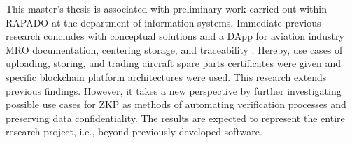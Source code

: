 This master's thesis is associated with preliminary work carried out within RAPADO at the department of information systems. Immediate previous research concludes with conceptual solutions and a DApp for aviation industry MRO documentation, centering storage, and traceability \citep{ZedelJ, semesterproject}. Hereby, use cases of uploading, storing, and trading aircraft spare parts certificates were given and specific blockchain platform architectures were used. This research extends previous findings. However, it takes a new perspective by further investigating possible use cases for ZKP as methods of automating verification processes and preserving data confidentiality. The results are expected to represent the entire research project, i.e., beyond previously developed software.

\begin{comment}
I. Systematic literature review according to vom Brocke, Cooper and Webster: 
    1. Definition of Scope
        - classification, examples, challenges and evaluation methods of zero knowledge proof protocols 
        
    2. Conceptualization
        - work with concept map
        - derive at a search string
        
    3. Literature Search and Selection
        - look for review paper first to get good overview about the topic
        a) exclude paper that are too old and have too few citations and/or low impact factor (e.g. 5.5 is high)
        b) exclusion acc. to title and keywords
        c) exclusion acc. to abstract & structure of paper & RQ
        c) exclusion acc. to full text & availability of resource
        
    4. Synthesizing of Literature
        - cluster definitions, examples, drawbacks and evaluation methods (first suggestion can be found in the preliminary agenda)
        - write overview section about ZKP (Chapter 4)
- - - - - - -
How to know if a paper is useful for me?
1.title 2.keywords 3.abstract 4.structure of the paper 5.examples/use cases 6.research question/formal problem definition
- - - - - - -
II. Design Science Research
- DSR method acc. to Peffers and Hevner

\end{comment}
\begin{comment}
2) Ziel der Arbeit, scope of work
- not scope to practically integrate any of the concepts into existing DApp or any other existing system
- welche use cases gibt es f{"u}r ZKPs in RAPADO
- wie k{"o}nnte man diese Umsetzen

4) Ergebnisse skizzieren
- implementation can be a proof of concept, software artifact depends highly on complexity of the use case
\end{comment}